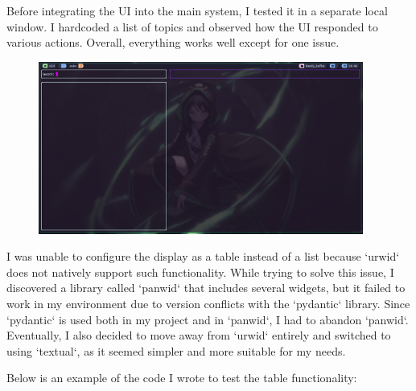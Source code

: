 \documentclass[10pt , a4paper]{report}
\begin{document}
Before integrating the UI into the main system, I tested it in a separate local window. I hardcoded a list of topics and observed how the UI responded to various actions. Overall, everything works well except for one issue.

\newpage
\begin{figure}[htbp]
  \begin{center}
    \includegraphics[width=0.95\textwidth]{imgs/UIFirstScreen.png}
  \end{center}
  \caption{}\label{fig:}
\end{figure}

I was unable to configure the display as a table instead of a list because `urwid` does not natively support such functionality. While trying to solve this issue, I discovered a library called `panwid` that includes several widgets, but it failed to work in my environment due to version conflicts with the `pydantic` library. Since `pydantic` is used both in my project and in `panwid`, I had to abandon `panwid`. Eventually, I also decided to move away from `urwid` entirely and switched to using `textual`, as it seemed simpler and more suitable for my needs.

Below is an example of the code I wrote to test the table functionality:
\end{document}
